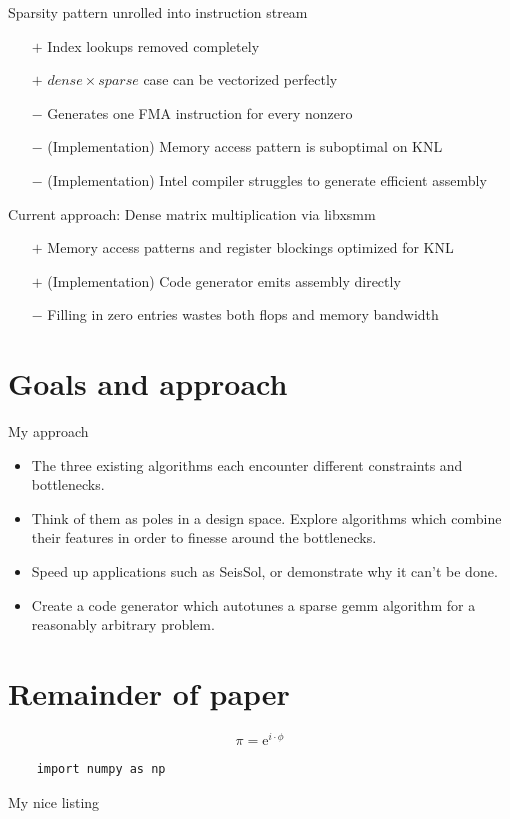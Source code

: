   Sparsity pattern unrolled into instruction stream
    \begin{itemize}
    \item[$+$] Index lookups removed completely
    \item[$+$] $dense \times sparse$ case can be vectorized perfectly 
    \item[$-$] Generates one FMA instruction for every nonzero
    \item[$-$] (Implementation) Memory access pattern is suboptimal on KNL
    \item[$-$] (Implementation) Intel compiler struggles to generate efficient assembly
    \end{itemize}

  Current approach: Dense matrix multiplication via libxsmm
    \begin{itemize}
    \item[$+$] Memory access patterns and register blockings optimized for KNL
    \item[$+$] (Implementation) Code generator emits assembly directly 
    \item[$-$] Filling in zero entries wastes both flops and memory bandwidth
    \end{itemize}


  \section{Goals and approach}
  My approach
    \begin{itemize}
    \item The three existing algorithms each encounter different constraints and bottlenecks.
    \item Think of them as poles in a design space. Explore algorithms which combine their features in order to finesse around the bottlenecks.
    \item Speed up applications such as SeisSol, or demonstrate why it can't be done.
    \item Create a code generator which autotunes a sparse gemm algorithm for a reasonably arbitrary problem.
    \end{itemize}

    \section{Remainder of paper}



\begin{equation}
	\pi = \mathrm{e}^{i\cdot\phi}
	\label{eq:equation1}
\end{equation}

\begin{listing}
	\begin{verbatim} 
	import numpy as np
	\end{verbatim}
  \caption{My nice listing}
  \label{lst:nice_listing}
\end{listing}
